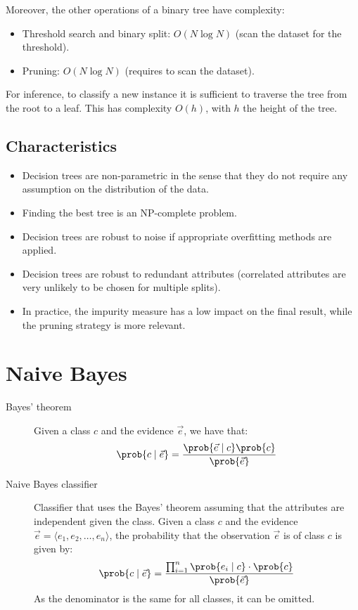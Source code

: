 Moreover, the other operations of a binary tree have complexity:
\begin{itemize}
    \item Threshold search and binary split: $O(N \log N)$ (scan the dataset for the threshold).
    \item Pruning: $O(N \log N)$ (requires to scan the dataset).
\end{itemize}

For inference, to classify a new instance it is sufficient to traverse the tree from the root to a leaf.
This has complexity $O(h)$, with $h$ the height of the tree.


\subsection{Characteristics}
\begin{itemize}
    \item Decision trees are non-parametric in the sense that they do not require any assumption on the distribution of the data.
    \item Finding the best tree is an NP-complete problem.
    \item Decision trees are robust to noise if appropriate overfitting methods are applied.
    \item Decision trees are robust to redundant attributes (correlated attributes are very unlikely to be chosen for multiple splits).
    \item In practice, the impurity measure has a low impact on the final result, while the pruning strategy is more relevant.
\end{itemize}



\section{Naive Bayes}

\begin{description}
    \item[Bayes' theorem]
        Given a class $c$ and the evidence $\vec{e}$, we have that:
        \[ \prob{c \mid \vec{e}} = \frac{\prob{\vec{e} \mid c} \prob{c}}{\prob{\vec{e}}} \]

    \item[Naive Bayes classifier] 
        Classifier that uses the Bayes' theorem assuming that the attributes are independent given the class.
        Given a class $c$ and the evidence $\vec{e} = \langle e_1, e_2, \dots, e_n \rangle$, the probability that 
        the observation $\vec{e}$ is of class $c$ is given by:
        \[
            \prob{c \mid \vec{e}} = \frac{\prod_{i=1}^{n}\prob{e_i \mid c} \cdot \prob{c}}{\prob{\vec{e}}}  
        \]
        As the denominator is the same for all classes, it can be omitted.
\end{description}


